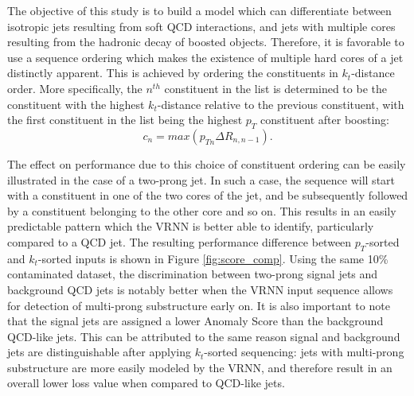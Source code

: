 \documentclass[12pt, a4paper]{article}
\begin{document}
The objective of this study is to build a model which can differentiate between isotropic jets resulting from soft QCD interactions, and jets with multiple cores resulting from the hadronic decay of boosted objects. Therefore, it is favorable to use a sequence ordering which makes the existence of multiple hard cores of a jet distinctly apparent. This is achieved by ordering the constituents in $k_{t}$-distance order. More specifically, the $n^{th}$ constituent in the list is determined to be the constituent with the highest $k_{t}$-distance relative to the previous constituent, with the first constituent in the list being the highest $p_{T}$ constituent after boosting:
\begin{equation}
	c_{n} = max(p_{Tn}\Delta R_{n, n-1}).
\end{equation}

The effect on performance due to this choice of constituent ordering can be easily illustrated in the case of a two-prong jet. In such a case, the sequence will start with a constituent in one of the two cores of the jet, and be subsequently followed by a constituent belonging to the other core and so on. This results in an easily predictable pattern which the VRNN is better able to identify, particularly compared to a QCD jet. The resulting performance difference between $p_{T}$-sorted and $k_{t}$-sorted inputs is shown in Figure \ref{fig:score_comp}. Using the same 10\% contaminated dataset, the discrimination between two-prong signal jets and background QCD jets is notably better when the VRNN input sequence allows for detection of multi-prong substructure early on. It is also important to note that the signal jets are assigned a lower Anomaly Score than the background QCD-like jets. This can be attributed to the same reason signal and background jets are distinguishable after applying $k_{t}$-sorted sequencing: jets with multi-prong substructure are more easily modeled by the VRNN, and therefore result in an overall lower loss value when compared to QCD-like jets. 
\end{document}
